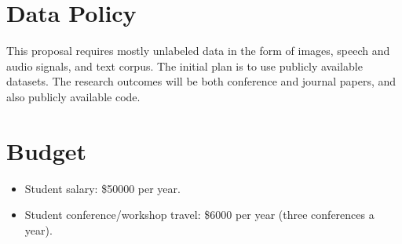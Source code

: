 \documentclass[11pt]{article}
\begin{document}
\section{Data Policy}

This proposal requires mostly unlabeled data in the form of images, speech and audio signals,
and text corpus. The initial plan is to use publicly available datasets.
The research outcomes will be both conference and journal papers, and also publicly available code. 

\section{Budget}

\begin{itemize}
\item Student salary: \$50000 per year.
\item Student conference/workshop travel: \$6000 per year (three conferences a year). 
\end{itemize}



\end{document}
